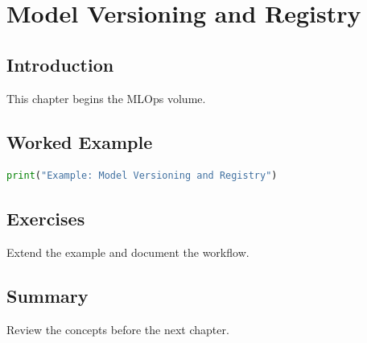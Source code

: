 \chapter{Model Versioning and Registry}
\label{chap:vol10-3}



\section{Introduction}
This chapter begins the MLOps volume.

\section{Worked Example}
\begin{lstlisting}[language=Python]
print("Example: Model Versioning and Registry")
\end{lstlisting}

\section{Exercises}
\begin{exercise}
Extend the example and document the workflow.
\end{exercise}

\section{Summary}
Review the concepts before the next chapter.
